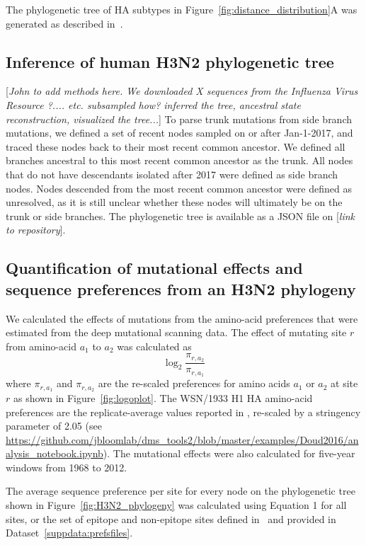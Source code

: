 \documentclass[9pt,twocolumn,twoside]{pnas-new}
\newcommand{\comment}[1]{{\color{red}[\textsl{#1}]}}
\begin{document}
{The phylogenetic tree of HA subtypes in Figure~\ref{fig:distance_distribution}A was generated as described in~\cite{doud2017quantifying}.

\subsection*{Inference of human H3N2 phylogenetic tree}
\comment{John to add methods here. We downloaded X sequences from the Influenza Virus Resource ?.... etc. subsampled how? inferred the tree, ancestral state reconstruction, visualized the tree...}
To parse trunk mutations from side branch mutations, we defined a set of recent nodes sampled on or after Jan-1-2017, and traced these nodes back to their most recent common ancestor. 
We defined all branches ancestral to this most recent common ancestor as the trunk.
All nodes that do not have descendants isolated after 2017 were defined as side branch nodes.
Nodes descended from the most recent common ancestor were defined as unresolved, as it is still unclear whether these nodes will ultimately be on the trunk or side branches.
The phylogenetic tree is available as a JSON file on \comment{link to repository}.

\subsection*{Quantification of mutational effects and sequence preferences from an H3N2 phylogeny}
We calculated the effects of mutations from the amino-acid preferences that were estimated from the deep mutational scanning data.
The effect of mutating site $r$ from amino-acid $a_1$ to $a_2$ was calculated as
\begin{equation}
\log_2 \frac{\pi_{r,a_2}}{\pi_{r,a_1}}
\end{equation}
where $\pi_{r,a_1}$ and $\pi_{r,a_2}$ are the re-scaled preferences for amino acids $a_1$ or $a_2$ at site $r$ as shown in Figure~\ref{fig:logoplot}.
The WSN/1933 H1 HA amino-acid preferences are the replicate-average values reported in \cite{doud2016accurate}, re-scaled by a stringency parameter of 2.05 (see \url{https://github.com/jbloomlab/dms_tools2/blob/master/examples/Doud2016/analysis_notebook.ipynb}).
The mutational effects were also calculated for five-year windows from 1968 to 2012.

The average sequence preference per site for every node on the phylogenetic tree shown in Figure~\ref{fig:H3N2_phylogeny} was calculated using Equation 1 for all sites, or the set of epitope and non-epitope sites defined in~\cite{wolf2006long} and provided in Dataset~\ref{suppdata:prefsfiles}.

}
\end{document}
